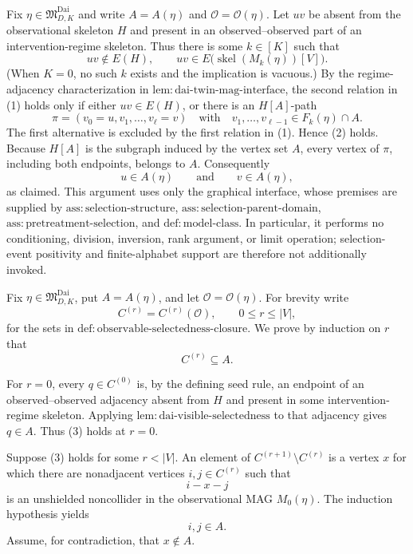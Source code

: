 Fix \(\eta\in\mathfrak M_{D,K}^{\mathrm{Dai}}\) and write \(A=A(\eta)\) and \(\mathcal O=\mathcal O(\eta)\).  Let \(uv\) be absent from the observational skeleton \(H\) and present in an observed--observed part of an intervention-regime skeleton.  Thus there is some \(k\in[K]\) such that
\[
uv\notin E(H),
\qquad
uv\in E\bigl(\operatorname{skel}(M_k(\eta))[V]\bigr).
\tag{1}
\]
(When \(K=0\), no such \(k\) exists and the implication is vacuous.)  By the regime-adjacency characterization in \(\mathrm{lem:dai\mbox{-}twin\mbox{-}mag\mbox{-}interface}\), the second relation in (1) holds only if either \(uv\in E(H)\), or there is an \(H[A]\)-path
\[
\pi=(v_0=u,v_1,\ldots,v_\ell=v)
\quad\text{with}\quad
v_1,\ldots,v_{\ell-1}\in F_k(\eta)\cap A.
\tag{2}
\]
The first alternative is excluded by the first relation in (1).  Hence (2) holds.  Because \(H[A]\) is the subgraph induced by the vertex set \(A\), every vertex of \(\pi\), including both endpoints, belongs to \(A\).  Consequently
\[
u\in A(\eta)
\qquad\text{and}\qquad
v\in A(\eta),
\]
as claimed.  This argument uses only the graphical interface, whose premises are supplied by \(\mathrm{ass:selection\mbox{-}structure}\), \(\mathrm{ass:selection\mbox{-}parent\mbox{-}domain}\), \(\mathrm{ass:pretreatment\mbox{-}selection}\), and \(\mathrm{def:model\mbox{-}class}\).  In particular, it performs no conditioning, division, inversion, rank argument, or limit operation; selection-event positivity and finite-alphabet support are therefore not additionally invoked.

Fix \(\eta\in\mathfrak M_{D,K}^{\mathrm{Dai}}\), put \(A=A(\eta)\), and let \(\mathcal O=\mathcal O(\eta)\).  For brevity write
\[
C^{(r)}=C^{(r)}(\mathcal O),\qquad 0\le r\le |V|,
\]
for the sets in \(\mathrm{def:observable\mbox{-}selectedness\mbox{-}closure}\).  We prove by induction on \(r\) that
\[
C^{(r)}\subseteq A.
\tag{3}
\]

For \(r=0\), every \(q\in C^{(0)}\) is, by the defining seed rule, an endpoint of an observed--observed adjacency absent from \(H\) and present in some intervention-regime skeleton.  Applying \(\mathrm{lem:dai\mbox{-}visible\mbox{-}selectedness}\) to that adjacency gives \(q\in A\).  Thus (3) holds at \(r=0\).

Suppose (3) holds for some \(r<|V|\).  An element of \(C^{(r+1)}\setminus C^{(r)}\) is a vertex \(x\) for which there are nonadjacent vertices \(i,j\in C^{(r)}\) such that
\[
i-x-j
\tag{4}
\]
is an unshielded noncollider in the observational MAG \(M_0(\eta)\).  The induction hypothesis yields
\[
i,j\in A.
\tag{5}
\]
Assume, for contradiction, that \(x\notin A\).

